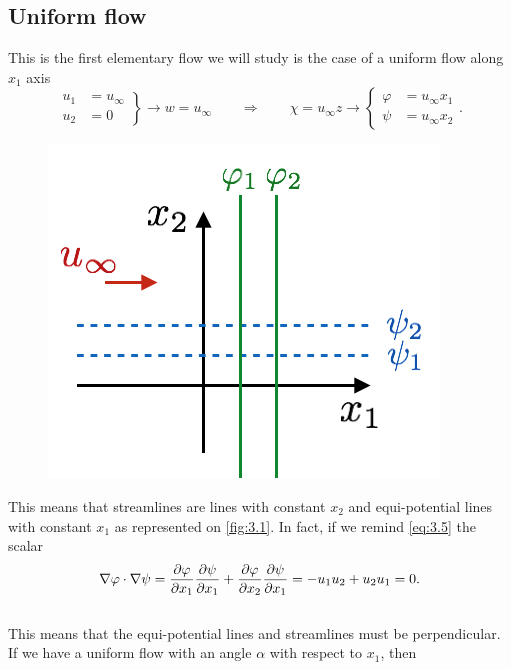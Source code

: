 	\subsection{Uniform flow}
		This is the first elementary flow we will study is the case of a uniform flow along $x_1$ axis 
		\begin{equation}
		\left. \begin{aligned}
		u_1 &= u_\infty\\
		u_2 &= 0
		\end{aligned}
		\right\} 
		 \rightarrow w = u_\infty  \qquad \Rightarrow \qquad \chi = u_\infty z \rightarrow 
		 \left\{
		 \begin{aligned}
		 \varphi &= u_\infty x_1\\
		 \psi &= u_\infty x_2
		 \end{aligned}
		 \right.
		 .
		\end{equation}		 
		\begin{figure}
		\vspace{-5mm}
		\includegraphics[scale=0.48]{ch3/1}
		\label{fig:3.1}
		\end{figure}		
		This means that streamlines are lines with constant $x_2$ and equi-potential lines with constant $x_1$ as represented on \autoref{fig:3.1}. In fact, if we remind \eqref{eq:3.5} the scalar 
		\begin{equation}
			\nabla \varphi \cdot \nabla \psi = \frac{\partial \varphi}{\partial x_1}\frac{\partial \psi}{\partial x_1} + \frac{\partial \varphi}{\partial x_2}\frac{\partial \psi}{\partial x_1} = -u_1u_2 +u_2u_1 = 0.
		\end{equation}
		\ \\ This means that the equi-potential lines and streamlines must be perpendicular. If we have a uniform flow with an angle $\alpha$ with respect to $x_1$, then 
